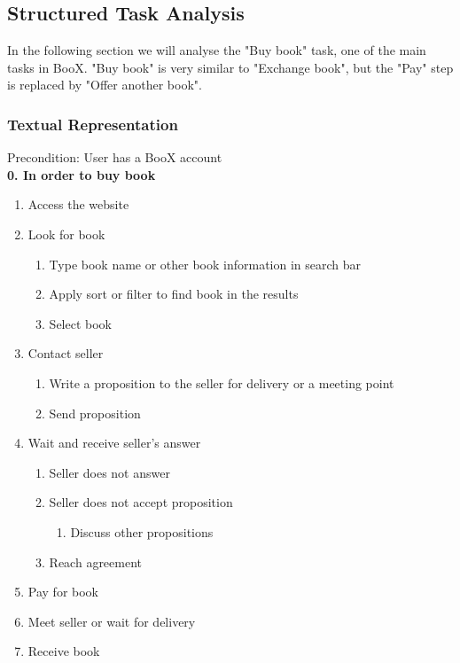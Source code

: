 \documentclass{article}
\begin{document}
\subsection{Structured Task Analysis}
In the following section we will analyse the "Buy book" task, one of the main tasks in BooX. "Buy book" is very similar to "Exchange book", but the "Pay" step is replaced by "Offer another book".\\

\subsubsection{Textual Representation}
Precondition: User has a BooX account\\
\textbf{0. In order to buy book}
    \begin{enumerate}
    \item Access the website
    \item Look for book
    \begin{enumerate}
      \item Type book name or other book information in search bar
      \item Apply sort or filter to find book in the results
      \item Select book
    \end{enumerate}
    \item Contact seller
    \begin{enumerate}
      \item Write a proposition to the seller for delivery or a meeting point 
      \item Send proposition
    \end{enumerate}
    \item Wait and receive seller's answer
    \begin{enumerate}
      \item Seller does not answer
      \item Seller does not accept proposition
      \begin{enumerate}
        \item Discuss other propositions
      \end{enumerate}
      \item Reach agreement
    \end{enumerate}
    \item Pay for book
    \item Meet seller or wait for delivery
    \item Receive book
    \end{enumerate}
\end{document}
